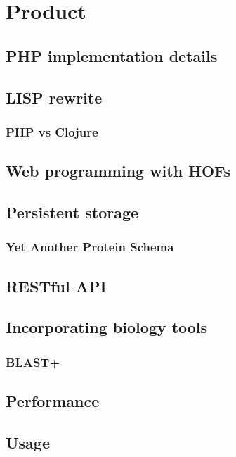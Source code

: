 \chapter{Product}

\section{PHP implementation details}

\section{LISP rewrite}
\subsection{PHP vs Clojure}
\section{Web programming with HOFs}

\section{Persistent storage}
\subsection{Yet Another Protein Schema}

\section{RESTful API}

\section{Incorporating biology tools}
\subsection{BLAST+}

\section{Performance}

\section{Usage}
